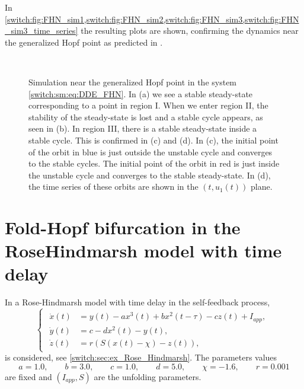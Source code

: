In \cref{switch:fig:FHN_sim1,switch:fig:FHN_sim2,switch:fig:FHN_sim3,switch:fig:FHN_sim3_time_series} the resulting plots are shown, confirming the dynamics near the generalized Hopf point as predicted in \cite{Kuznetsov2004}.
%
\begin{figure}[ht!]
\centering
{}\hspace*{\fill}\\
\hspace*{\fill}
\caption{Simulation near the generalized Hopf point in the system \cref{switch:sm:eq:DDE_FHN}. In \textup{(a)} we see a stable steady-state corresponding to a point in region I. When we enter region II, the stability of the steady-state is lost and a stable cycle appears, as seen in  \textup{(b)}. In region III, there is a stable steady-state inside a stable cycle. This is confirmed in \textup{(c)} and \textup{(d)}. In \textup{(c)}, the initial point of the orbit in blue is just outside the unstable cycle and converges to the stable cycles. The initial point of the orbit in red is just inside the unstable cycle and converges to the stable steady-state. In \textup{(d)}, the time series of these orbits are shown in the $(t,u_1(t))$ plane.}
\end{figure}

\section{Fold-Hopf bifurcation in the Rose\textendash Hindmarsh model with time delay}
%
In \cite{Ma2011} a Rose-Hindmarsh model \cite{Hindmarsh1982,Hindmarsh1984} with time delay in the self-feedback process, 
\begin{equation}
\begin{cases}
\begin{aligned}
\dot{x}(t)& = y(t)-ax^3(t)+bx^2(t-\tau)-cz(t)+I_{app},\\
\dot{y}(t)& = c-dx^2(t)-y(t),\\
\dot{z}(t)& = r(S(x(t)-\chi)-z(t)),
\end{aligned}
\end{cases}\label{switch:sm:eq:Rose-Hindmarsh}
\end{equation}
is considered, see \cref{switch:sec:ex_Rose_Hindmarsh}. The parameters values
\begin{equation}
a=1.0,\qquad b=3.0,\qquad c=1.0,\qquad d=5.0,\qquad\chi=-1.6,\qquad r=0.001\label{switch:sm:eq:rose_hindmarsh_pm1}
\end{equation}
are fixed and $(I_{app},S)$ are the unfolding parameters.

